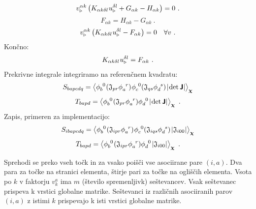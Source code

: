 \begin{equation*}
   v^{\alpha k}_{\triangleright} \left(
      K_{\alpha k \delta l} \mkern1mu u^{\delta l}_\triangleright
      +
      G_{\alpha k}
      -
      H_{\alpha k}
   \right) = 0 \ .
\end{equation*}
\begin{equation*}
   F_{\alpha k} = H_{\alpha k} - G_{\alpha k} \ .
\end{equation*}
\begin{equation*}
   v^{\alpha k}_{\triangleright} \left(
      K_{\alpha k \delta l} \mkern1mu u^{\delta l}_\triangleright
      -
      F_{\alpha k}
   \right) = 0 \quad \forall v \ .
\end{equation*}
Končno:
\begin{equation}
      K_{\alpha k \delta l} \mkern1mu u^{\delta l}_\triangleright
      =
      F_{\alpha k} \ .
\end{equation}
Prekrivne integrale integriramo na referenčnem kvadratu:
\begin{equation}
   S_{bapcdq} = \left\langle \phi^{\phantom{b}0}_b \mkern1mu ( \mathfrak{J}_{pr} \phi^{\phantom{a}r}_a ) \mkern1mu \phi^{\phantom{c}0}_c ( \mathfrak{J}_{qs}  \phi^{\phantom{d}s}_d ) \mkern2mu |\mkern-2mu \det \bm{\mathsf{J}}| \right\rangle_{\bm{\chi}}
\end{equation}
\begin{equation}
   T_{bapd} = \left\langle \phi^{\phantom{b}0}_b \mkern1mu ( \mathfrak{J}_{pr} \phi^{\phantom{a}r}_a ) \phi^{\phantom{d}0}_d \mkern2mu |\mkern-2mu \det \bm{\mathsf{J}}| \right\rangle_{\bm{\chi}} \ .
\end{equation}
Zapis, primeren za implementacijo:
\begin{equation}
   S_{ibapcdq} = \left\langle \phi^{\phantom{b}0}_b \mkern1mu ( \mathfrak{J}_{ipr} \phi^{\phantom{a}r}_a ) \mkern1mu \phi^{\phantom{c}0}_c ( \mathfrak{J}_{iqs}  \phi^{\phantom{d}s}_d ) \mkern2mu |\mathfrak{J}_{i00}| \right\rangle_{\bm{\chi}}
\end{equation}
\begin{equation}
   T_{bapd} = \left\langle \phi^{\phantom{b}0}_b \mkern1mu ( \mathfrak{J}_{ipr} \phi^{\phantom{a}r}_a ) \phi^{\phantom{d}0}_d \mkern2mu | \mathfrak{J}_{i00}| \right\rangle_{\bm{\chi}} \ .
\end{equation}

Sprehodi se preko vseh točk in za vsako poišči vse asociirane pare $(i, a)$. Dva para za točke na stranici elementa, štirje pari za točke na ogliščih elementa. Vsota po $k$ v faktorju $v^a_k$ ima $m$ (število spremenljivk) seštevancev. Vsak seštevanec prispeva k vrstici globalne matrike. Seštevanci iz različnih asociiranih parov $(i, a)$ z istimi $k$ prispevajo k isti vrstici globalne matrike.


